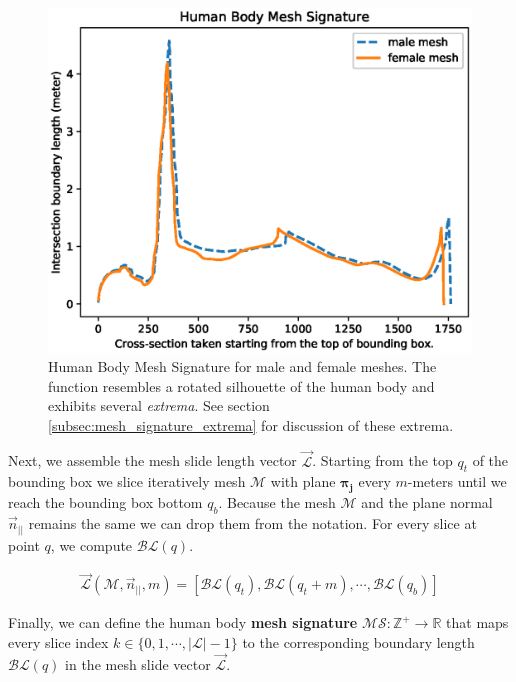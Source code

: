 \documentclass[runningheads, orivec]{llncs}
\begin{document}
\begin{figure}[t]
	\begin{center}
		\includegraphics[width=\linewidth]{Figure_1.eps}
	\end{center}
	\caption{Human Body Mesh Signature for male and female meshes. The 
		function resembles a rotated silhouette of the human body and exhibits 
		several \textit{extrema}. See section 
		\ref{subsec:mesh_signature_extrema} for discussion of these extrema.}
	\label{fig:hbm_signature}
\end{figure}

Next, we assemble the mesh slide length vector $\vec{\mathcal{L}}$. Starting 
from the 
top $q_t$ of the bounding box we slice iteratively mesh $\mathcal{M}$ with 
plane 
$\boldsymbol{\pi_j}$ every $m$-meters until we reach the bounding box bottom 
$q_b$. Because the mesh $\mathcal{M}$ and the plane normal $\vec{n}_{||}$ 
remains the same we can drop them from the notation. For every slice at point 
$q$, we compute $\mathcal{BL}(q)$.

\begin{align}
\vec{\mathcal{L}}(\mathcal{M}, \vec{n}_{||}, m) = \left[ \mathcal{BL}(q_t), 
\mathcal{BL}(q_t+m), \cdots, \mathcal{BL}(q_b) \right]
\end{align}

Finally, we can define the human body \textbf{mesh signature} $\mathcal{MS}: 
\mathbb{Z}^+ \to \mathbb{R}$ that maps every slice index $k \in \{0, 1, \cdots, 
|\mathcal{L}|-1\}$ to the corresponding boundary length $\mathcal{BL}(q)$ in 
the mesh slide vector $\vec{\mathcal{L}}$.
\end{document}
